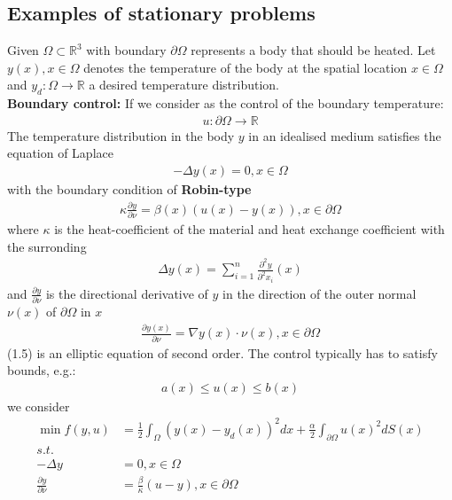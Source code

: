 \subsection{Examples of stationary problems}
\begin{example}
	Given $\Omega \subset \mathbb{R}^3$ with boundary $\partial \Omega$ represents a body that should be heated. Let $y(x), x \in \Omega$ denotes the temperature of the body at the spatial location $x \in \Omega$ and $y_d: \Omega \rightarrow \mathbb{R}$ a desired temperature distribution. \\
	\textbf{Boundary control:}
	If we consider as the control of the boundary temperature:
	\begin{align*}
		u: \partial \Omega \rightarrow \mathbb{R}
	\end{align*}
	The temperature distribution in the body $y$ in an idealised medium satisfies the equation of Laplace
	\begin{align}
		- \Delta y(x) = 0, x \in \Omega
	\end{align}
	with the boundary condition of \textbf{Robin-type}
	\begin{align*}
		\kappa \frac{\partial y}{\partial \nu} = \beta(x) (u(x) - y(x)), x \in \partial \Omega
	\end{align*}
	where $\kappa$ is the heat-coefficient of the material and heat exchange coefficient with the surronding 
	\begin{align*}
		\Delta y(x) = \sum_{i = 1}^n \frac{\partial^2 y}{\partial^2 x_i}(x)
	\end{align*}
	and $\frac{\partial y}{\partial \nu}$ 
	is the directional derivative of $y$ in the direction of the outer normal $\nu(x)$ of $\partial \Omega$ in $x$ 
	\begin{align*}
		\frac{\partial y(x)}{\partial \nu} = \nabla y(x) \cdot \nu(x), x \in \partial \Omega
	\end{align*}
	(1.5) is an elliptic equation of second order. The control typically has to satisfy bounds, e.g.:
\begin{align*}
	a(x) \le u(x) \le b(x)
\end{align*}
we consider
\begin{align*}
	\min f(y, u) &= \frac{1}{2}\int_\Omega (y(x) - y_d(x))^2 dx + \frac{\alpha}{2} \int_{\partial \Omega} u(x)^2 dS(x)\\
	s.t.\\
	 - \Delta y &= 0, x \in \Omega\\
	\frac{\partial y}{\partial \nu} &= \frac{\beta}{\kappa}(u - y), x \in \partial \Omega\\

\end{align*}
\end{example}
